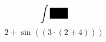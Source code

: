 \documentclass[]{article}
\begin{document}
\begin{equation}
	\int{\colorbox{000222222}{$ 2dx $}}
\end{equation}
\begin{equation}
	2 + \sin\left(\left(3 \cdot \left(2 + 4\right)\right)\right)
\end{equation}
\end{document}
